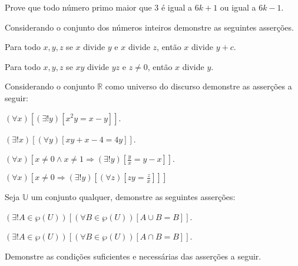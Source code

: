 \begin{questao}\label{test:Demosntracoes12}
	Prove que todo número primo maior que $3$ é igual a $6k+1$ ou igual a $6k-1$.
\end{questao}

\begin{questao}\label{test:Demosntracoes13}
	Considerando o conjunto dos números inteiros demonstre as seguintes asserções.
\end{questao}

\begin{exerList}
	\item Para todo $x, y, z$ se $x$ divide $y$ e $x$ divide $z$, então $x$ divide $y + c$.
	\item Para todo $x, y, z$ se $xy$ divide $yz$ e $z \neq 0$, então $x$ divide $y$.
\end{exerList}

\begin{questao}\label{test:Demosntracoes14}
	Considerando o conjunto $ \mathbb{R}$ como universo do discurso demonstre as asserções a seguir:
\end{questao}

\begin{exerList}
	\item $(\forall x)[(\exists ! y)[x^2y = x - y]]$.
	\item $(\exists ! x)[(\forall y)[xy + x - 4 = 4y]]$.
	\item $(\forall x)[x \neq 0 \land x \neq 1 \Rightarrow (\exists! y)[\frac{y}{x} = y-x]]$.
	\item $(\forall x)[x \neq 0 \Rightarrow (\exists ! y)[(\forall z)[zy = \frac{z}{x}]]]$
\end{exerList}

\begin{questao}\label{test:Demosntracoes15}
	Seja $\mathbb{U}$ um conjunto qualquer, demonstre as seguintes asserções:
\end{questao}

\begin{exerList}
	\item $(\exists! A \in \wp(U))[(\forall B \in \wp(U))[A \cup B = B]]$.
	\item $(\exists! A \in \wp(U))[(\forall B \in \wp(U))[A \cap B = B]]$.
\end{exerList}

\begin{questao}\label{test:Demosntracoes16}
	Demonstre as condições suficientes e necessárias das asserções a seguir.
\end{questao}

